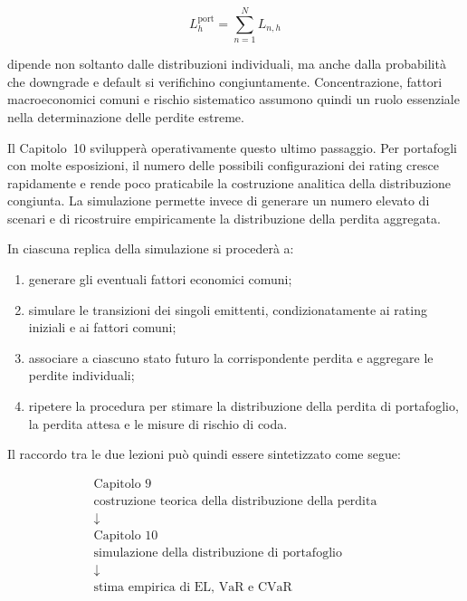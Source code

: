 \[
L_h^{\mathrm{port}}
=
\sum_{n=1}^{N}L_{n,h}
\]

dipende non soltanto dalle distribuzioni individuali, ma anche dalla
probabilit\`{a} che downgrade e default si verifichino congiuntamente.
Concentrazione, fattori macroeconomici comuni e rischio sistematico
assumono quindi un ruolo essenziale nella determinazione delle perdite
estreme.

Il Capitolo~10 svilupper\`{a} operativamente questo ultimo passaggio.
Per portafogli con molte esposizioni, il numero delle possibili
configurazioni dei rating cresce rapidamente e rende poco praticabile
la costruzione analitica della distribuzione congiunta. La simulazione
permette invece di generare un numero elevato di scenari e di
ricostruire empiricamente la distribuzione della perdita aggregata.

In ciascuna replica della simulazione si proceder\`{a} a:

\begin{enumerate}

\item generare gli eventuali fattori economici comuni;

\item simulare le transizioni dei singoli emittenti, condizionatamente
ai rating iniziali e ai fattori comuni;

\item associare a ciascuno stato futuro la corrispondente perdita e
aggregare le perdite individuali;

\item ripetere la procedura per stimare la distribuzione della perdita
di portafoglio, la perdita attesa e le misure di rischio di coda.

\end{enumerate}

Il raccordo tra le due lezioni pu\`{o} quindi essere sintetizzato come
segue:

\[
\boxed{
\begin{array}{c}
\text{Capitolo 9}
\\
\text{costruzione teorica della distribuzione della perdita}
\\[2mm]
\downarrow
\\[2mm]
\text{Capitolo 10}
\\
\text{simulazione della distribuzione di portafoglio}
\\[2mm]
\downarrow
\\[2mm]
\text{stima empirica di EL, VaR e CVaR}
\end{array}
}
\]

